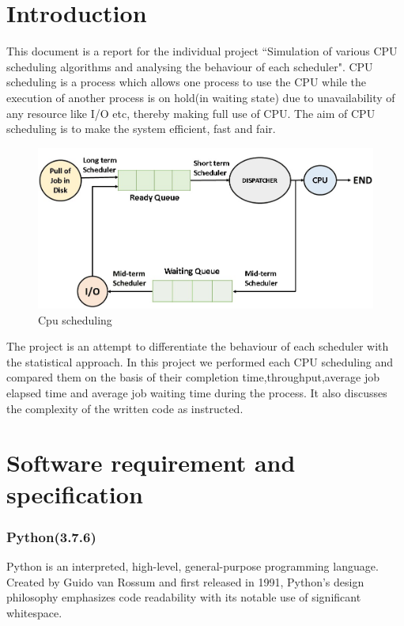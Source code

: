 \documentclass[11pt,a4paper]{report}
\begin{document}
\tableofcontents

\chapter{Introduction}
\vskip 1cm
\hspace*{\parindent}This document is a report for the individual project ``Simulation of various CPU scheduling algorithms and analysing the behaviour of each scheduler". CPU scheduling is a process which allows one process to use the CPU while the execution of another process is on hold(in waiting state) due to unavailability of any resource like I/O etc, thereby making full use of CPU. The aim of CPU scheduling is to make the system efficient, fast and fair.\\ 
\vskip 1cm
\begin{figure}[H]
\centering
\includegraphics[scale=0.5]{./img/cpu.jpg}
\caption{Cpu scheduling}
\end{figure}

The project is an attempt to differentiate the behaviour of each scheduler with the statistical approach. In this project we performed each CPU scheduling and compared them on the basis of their completion time,throughput,average job elapsed time and average job waiting time during the process. It also discusses the complexity of the written code as instructed.


\chapter{Software requirement and specification}

\subsection*{Python(3.7.6)}
{Python is an interpreted, high-level, general-purpose programming language. Created by Guido van Rossum and first released in 1991, Python's design philosophy emphasizes code readability with its notable use of significant whitespace.}
\end{document}
